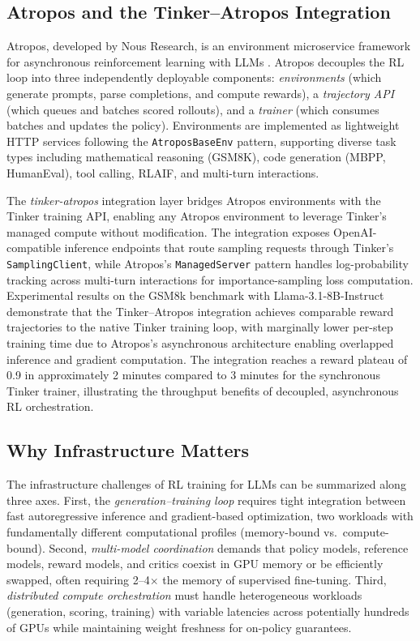 \subsection{Atropos and the Tinker--Atropos Integration}

Atropos, developed by Nous Research, is an environment microservice framework for asynchronous reinforcement learning with LLMs \cite{atropos2025}. Atropos decouples the RL loop into three independently deployable components: \textit{environments} (which generate prompts, parse completions, and compute rewards), a \textit{trajectory API} (which queues and batches scored rollouts), and a \textit{trainer} (which consumes batches and updates the policy). Environments are implemented as lightweight HTTP services following the \texttt{AtroposBaseEnv} pattern, supporting diverse task types including mathematical reasoning (GSM8K), code generation (MBPP, HumanEval), tool calling, RLAIF, and multi-turn interactions.

The \textit{tinker-atropos} integration layer bridges Atropos environments with the Tinker training API, enabling any Atropos environment to leverage Tinker's managed compute without modification. The integration exposes OpenAI-compatible inference endpoints that route sampling requests through Tinker's \texttt{SamplingClient}, while Atropos's \texttt{ManagedServer} pattern handles log-probability tracking across multi-turn interactions for importance-sampling loss computation. Experimental results on the GSM8k benchmark with Llama-3.1-8B-Instruct demonstrate that the Tinker--Atropos integration achieves comparable reward trajectories to the native Tinker training loop, with marginally lower per-step training time due to Atropos's asynchronous architecture enabling overlapped inference and gradient computation. The integration reaches a reward plateau of 0.9 in approximately 2 minutes compared to 3 minutes for the synchronous Tinker trainer, illustrating the throughput benefits of decoupled, asynchronous RL orchestration.

\subsection{Why Infrastructure Matters}

The infrastructure challenges of RL training for LLMs can be summarized along three axes. First, the \textit{generation--training loop} requires tight integration between fast autoregressive inference and gradient-based optimization, two workloads with fundamentally different computational profiles (memory-bound vs.\ compute-bound). Second, \textit{multi-model coordination} demands that policy models, reference models, reward models, and critics coexist in GPU memory or be efficiently swapped, often requiring 2--4$\times$ the memory of supervised fine-tuning. Third, \textit{distributed compute orchestration} must handle heterogeneous workloads (generation, scoring, training) with variable latencies across potentially hundreds of GPUs while maintaining weight freshness for on-policy guarantees.


